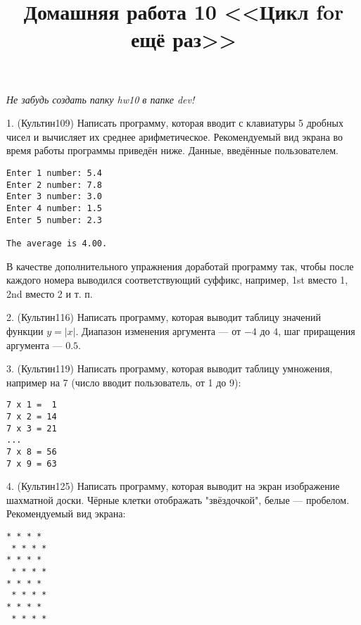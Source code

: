 \documentclass[12pt,russian,draft]{article}
\title{Домашняя работа 10 <<Цикл for ещё раз>>}
\date{}
\begin{document}
\maketitle{}

\emph{Не забудь создать папку hw10 в папке dev!}

1. (Культин109) Написать программу, которая вводит с клавиатуры 5 дробных чисел
и вычисляет их среднее арифметическое.  Рекомендуемый вид экрана во время
работы програм\-мы приведён ниже. Данные, введённые пользователем.

\begin{Verbatim}
Enter 1 number: 5.4
Enter 2 number: 7.8
Enter 3 number: 3.0
Enter 4 number: 1.5
Enter 5 number: 2.3

The average is 4.00.
\end{Verbatim}

В качестве дополнительного упражнения доработай программу так, чтобы после
каждого номера выводился соответствующий суффикс, например, 1st вместо 1, 2nd
вместо 2 и т. п.

2. (Культин116) Написать программу, которая выводит таблицу значений функции
$y=|x|$. Диапазон изменения аргумента --- от $-4$ до $4$, шаг приращения
аргумента --- $0.5$.

3. (Культин119) Написать программу, которая выводит таблицу умножения, например
на 7 (число вводит пользователь, от 1 до 9): 

\begin{Verbatim}
7 x 1 =  1
7 x 2 = 14
7 x 3 = 21
...
7 x 8 = 56
7 x 9 = 63
\end{Verbatim}

4. (Культин125) Написать программу, которая выводит на экран изображение шахматной доски. Чёрные клетки отображать "звёздочкой", белые --- пробелом. Рекомендуемый вид экрана:
\begin{Verbatim}
* * * * 
 * * * *
* * * * 
 * * * *
* * * * 
 * * * *
* * * * 
 * * * *
\end{Verbatim}
\end{document}

